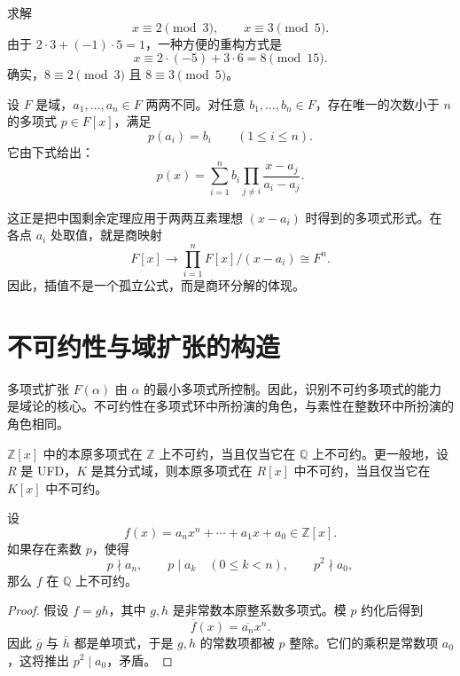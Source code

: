 \begin{example}[求解联立同余]
求解
\[
    x\equiv2\pmod3,
    \qquad
    x\equiv3\pmod5.
\]
由于 $2\cdot3+(-1)\cdot5=1$，一种方便的重构方式是
\[
    x\equiv2\cdot(-5)+3\cdot6=8\pmod{15}.
\]
确实，$8\equiv2\pmod3$ 且 $8\equiv3\pmod5$。
\end{example}

\begin{theorem}[Lagrange 插值]
设 $F$ 是域，$a_1,\dots,a_n\in F$ 两两不同。对任意 $b_1,\dots,b_n\in F$，存在唯一的次数小于 $n$ 的多项式 $p\in F[x]$，满足
\[
    p(a_i)=b_i\qquad(1\leq i\leq n).
\]
它由下式给出：
\[
    p(x)=\sum_{i=1}^n b_i
    \prod_{j\neq i}\frac{x-a_j}{a_i-a_j}.
\]
\end{theorem}

\begin{remark}
这正是把中国剩余定理应用于两两互素理想 $(x-a_i)$ 时得到的多项式形式。在各点 $a_i$ 处取值，就是商映射
\[
    F[x]\longrightarrow
    \prod_{i=1}^n F[x]/(x-a_i)
    \cong F^n.
\]
因此，插值不是一个孤立公式，而是商环分解的体现。
\end{remark}

\section{不可约性与域扩张的构造}

多项式扩张 $F(\alpha)$ 由 $\alpha$ 的最小多项式所控制。因此，识别不可约多项式的能力是域论的核心。不可约性在多项式环中所扮演的角色，与素性在整数环中所扮演的角色相同。

\begin{theorem}[Gauss 引理]
$\mathbb{Z}[x]$ 中的本原多项式在 $\mathbb{Z}$ 上不可约，当且仅当它在 $\mathbb{Q}$ 上不可约。更一般地，设 $R$ 是 UFD，$K$ 是其分式域，则本原多项式在 $R[x]$ 中不可约，当且仅当它在 $K[x]$ 中不可约。
\end{theorem}

\begin{theorem}
设
\[
    f(x)=a_nx^n+\cdots+a_1x+a_0\in\mathbb{Z}[x].
\]
如果存在素数 $p$，使得
\[
    p\nmid a_n,
    \qquad
    p\mid a_k\quad(0\leq k<n),
    \qquad
    p^2\nmid a_0,
\]
那么 $f$ 在 $\mathbb{Q}$ 上不可约。
\end{theorem}

\begin{proof}
假设 $f=gh$，其中 $g,h$ 是非常数本原整系数多项式。模 $p$ 约化后得到
\[
    \overline{f}(x)=\overline{a_n}x^n.
\]
因此 $\overline{g}$ 与 $\overline{h}$ 都是单项式，于是 $g,h$ 的常数项都被 $p$ 整除。它们的乘积是常数项 $a_0$，这将推出 $p^2\mid a_0$，矛盾。
\end{proof}

